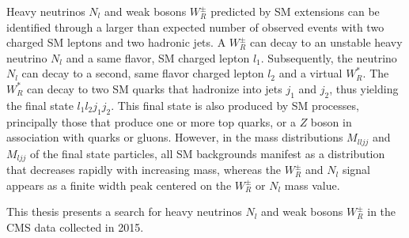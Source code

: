 Heavy neutrinos $N_{l}$ and weak bosons $W^{\pm}_{R}$ predicted by SM extensions can be identified through a larger 
than expected number of observed events with two charged SM leptons and two hadronic jets.  A $W^{\pm}_{R}$ can 
decay to an unstable heavy neutrino $N_{l}$ and a same flavor, SM charged lepton $l_{1}$.  Subsequently, the 
neutrino $N_{l}$ can decay to a second, same flavor charged lepton $l_{2}$ and a virtual $W^{*}_{R}$.  The $W^{*}_{R}$ can 
decay to two SM quarks that hadronize into jets $j_{1}$ and $j_{2}$, thus yielding the final state $l_{1}l_{2}j_{1}j_{2}$.  
This final state is also produced by SM processes, principally those that produce one or more top quarks, or 
a $Z$ boson in association with quarks or gluons.  However, in the mass distributions $M_{lljj}$ and $M_{ljj}$ 
of the final state particles, all SM backgrounds manifest as a distribution that decreases rapidly with increasing 
mass, whereas the $W^{\pm}_{R}$ and $N_{l}$ signal appears as a finite width peak centered on the $W^{\pm}_{R}$ 
or $N_{l}$ mass value.

This thesis presents a search for heavy neutrinos $N_{l}$ and weak bosons $W^{\pm}_{R}$ in the CMS data collected 
in 2015.

